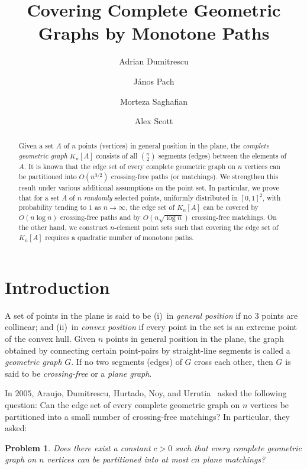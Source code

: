 \documentclass[a4paper,USenglish]{lipics-v2021}
\title{Covering Complete Geometric Graphs by Monotone Paths}
\author{Adrian Dumitrescu}
{Algoresearch L.L.C., Milwaukee, WI, USA}
{ad.dumitrescu@algoresearch.org}
{0000-0002-1118-0321}{}
\author{J\'anos Pach}
{Alfr\'ed R\'enyi Institute of Mathematics, Budapest, Hungary}
{pach@renyi.hu}
{0000-0002-2389-2035}
{}
\author{Morteza Saghafian}
{IST Austria (Institute of Science and Technology Austria), Kloster\-neu\-burg, Austria}
{morteza.saghafian@ist.ac.at}
{0000-0002-4201-5775}
{}
\author{Alex Scott}
{Mathematical Institute, University of Oxford, UK}
{scott@maths.ox.ac.uk}
{0000-0003-4489-5988}
{}
\newtheorem{problem}[theorem]{Problem}
\begin{document}
\maketitle

\begin{abstract}
  Given a set $A$ of $n$ points (vertices) in general position in the plane, the
  \emph{complete geometric graph} $K_n[A]$ 
  consists of all $\binom{n}{2}$ segments (edges) between the elements of $A$.
  It is known that the edge set of every complete geometric graph on $n$
  vertices can be partitioned into $O(n^{3/2})$ crossing-free paths (or matchings).
  We strengthen this result under various additional assumptions on the  point set.
  In particular, we prove that for a set $A$ of $n$ \emph{randomly} selected points,
  uniformly distributed in $[0,1]^2$, with probability tending to $1$ as $n\rightarrow\infty$,
  the edge set of $K_n[A]$ can be covered by $O(n\log n)$ crossing-free paths and by 
  $O(n\sqrt{\log n})$ crossing-free matchings.
On the other hand, we construct $n$-element point sets such that covering the edge set of $K_n[A]$ requires a quadratic number of monotone paths.  
\end{abstract}



\section{Introduction} \label{sec:intro}

A set of points in the plane is said to be
(i)~in \emph{general position} if no $3$ points are collinear; and
(ii)~in \emph{convex position} if every point in the set is an extreme point of the convex hull.
Given $n$ points in general position in the plane, the graph obtained 
by connecting certain point-pairs by straight-line segments is called a \emph{geometric graph} $G$.
If no two segments (edges) of $G$ cross each other, then $G$ is said to be
\emph{crossing-free} or a \emph{plane graph}. 

In $2005$, Araujo, Dumitrescu, Hurtado, Noy, and Urrutia~\cite{ADH+05} asked the following question:
Can the edge set of every complete geometric graph on $n$ vertices be partitioned into a small number
of crossing-free matchings? In particular, they asked:

\begin{problem} \label{problem:1}
  Does there exist a constant $c>0$ such that every complete geometric graph on $n$ vertices
  can be partitioned into at most $c n$ plane matchings?
\end{problem}
\end{document}
